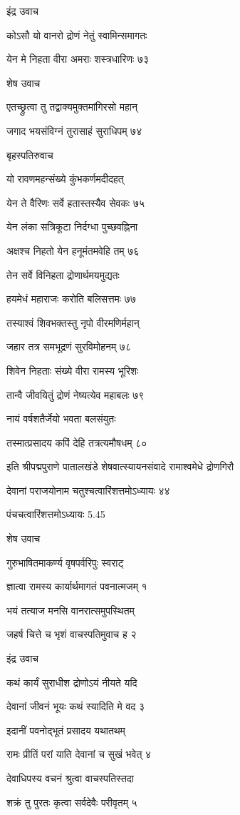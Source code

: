 इंद्र उवाच

कोऽसौ यो वानरो द्रोणं नेतुं स्वामिन्समागतः

येन मे निहता वीरा अमराः शस्त्रधारिणः ७३

शेष उवाच

एतच्छ्रुत्वा तु तद्वाक्यमुक्तमांगिरसो महान्

जगाद भयसंविग्नं तुरासाहं सुराधिपम् ७४

बृहस्पतिरुवाच

यो रावणमहन्संख्ये कुंभकर्णमदीदहत्

येन ते वैरिणः सर्वे हतास्तस्यैव सेवकः ७५

येन लंका सत्रिकूटा निर्दग्धा पुच्छवह्निना

अक्षश्च निहतो येन हनूमंतमवेहि तम् ७६

तेन सर्वे विनिहता द्रोणार्थमयमुद्यतः

हयमेधं महाराजः करोति बलिसत्तमः ७७

तस्याश्वं शिवभक्तस्तु नृपो वीरमणिर्महान्

जहार तत्र समभूद्रणं सुरविमोहनम् ७८

शिवेन निहताः संख्ये वीरा रामस्य भूरिशः

तान्वै जीवयितुं द्रोणं नेष्यत्येव महाबलः ७९

नायं वर्षशतैर्जेयो भवता बलसंयुतः

तस्मात्प्रसादय कपिं देहि तत्रत्यमौषधम् ८०

इति श्रीपद्मपुराणे पातालखंडे शेषवात्स्यायनसंवादे रामाश्वमेधे द्रोणगिरौ

देवानां पराजयोनाम चतुश्चत्वारिंशत्तमोऽध्यायः ४४

पंचचत्वारिंशत्तमोऽध्यायः 5.45

शेष उवाच

गुरुभाषितमाकर्ण्य वृषपर्वरिपुः स्वराट्

ज्ञात्वा रामस्य कार्यार्थमागतं पवनात्मजम् १

भयं तत्याज मनसि वानरात्समुपस्थितम्

जहर्ष चित्ते च भृशं वाचस्पतिमुवाच ह २

इंद्र उवाच

कथं कार्यं सुराधीश द्रोणोऽयं नीयते यदि

देवानां जीवनं भूयः कथं स्यादिति मे वद ३

इदानीं पवनोद्भूतं प्रसादय यथातथम्

रामः प्रीतिं परां याति देवानां च सुखं भवेत् ४

देवाधिपस्य वचनं श्रुत्वा वाचस्पतिस्तदा

शक्रं तु पुरतः कृत्वा सर्वदेवैः परीवृतम् ५

